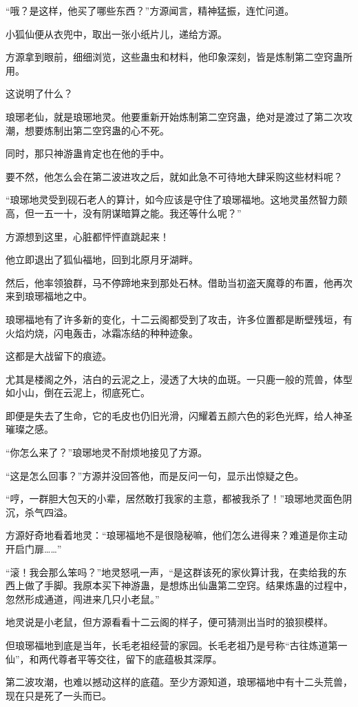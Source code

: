 \begin{this_body}
“哦？是这样，他买了哪些东西？”方源闻言，精神猛振，连忙问道。

小狐仙便从衣兜中，取出一张小纸片儿，递给方源。

方源拿到眼前，细细浏览，这些蛊虫和材料，他印象深刻，皆是炼制第二空窍蛊所用。

这说明了什么？

琅琊老仙，就是琅琊地灵。他要重新开始炼制第二空窍蛊，绝对是渡过了第二次攻潮，想要炼制出第二空窍蛊的心不死。

同时，那只神游蛊肯定也在他的手中。

要不然，他怎么会在第二波进攻之后，就如此急不可待地大肆采购这些材料呢？

“琅琊地灵受到砚石老人的算计，如今应该是守住了琅琊福地。这地灵虽然智力颇高，但一五一十，没有阴谋暗算之能。我还等什么呢？”

方源想到这里，心脏都怦怦直跳起来！

他立即退出了狐仙福地，回到北原月牙湖畔。

然后，他率领狼群，马不停蹄地来到那处石林。借助当初盗天魔尊的布置，他再次来到琅琊福地之中。

琅琊福地有了许多新的变化，十二云阁都受到了攻击，许多位置都是断壁残垣，有火焰灼烧，闪电轰击，冰霜冻结的种种迹象。

这都是大战留下的痕迹。

尤其是楼阁之外，洁白的云泥之上，浸透了大块的血斑。一只鹿一般的荒兽，体型如小山，倒在云泥上，彻底死亡。

即便是失去了生命，它的毛皮也仍旧光滑，闪耀着五颜六色的彩色光辉，给人神圣璀璨之感。

“你怎么来了？”琅琊地灵不耐烦地接见了方源。

“这是怎么回事？”方源并没回答他，而是反问一句，显示出惊疑之色。

“哼，一群胆大包天的小辈，居然敢打我家的主意，都被我杀了！”琅琊地灵面色阴沉，杀气四溢。

方源好奇地看着地灵：“琅琊福地不是很隐秘嘛，他们怎么进得来？难道是你主动开启门扉……”

“滚！我会那么笨吗？”地灵怒吼一声，“是这群该死的家伙算计我，在卖给我的东西上做了手脚。我原本买下神游蛊，是想炼出仙蛊第二空窍。结果炼蛊的过程中，忽然形成通道，闯进来几只小老鼠。”

地灵说是小老鼠，但方源看看十二云阁的样子，便可猜测出当时的狼狈模样。

但琅琊福地到底是当年，长毛老祖经营的家园。长毛老祖乃是号称“古往炼道第一仙”，和两代尊者平等交往，留下的底蕴极其深厚。

第二波攻潮，也难以撼动这样的底蕴。至少方源知道，琅琊福地中有十二头荒兽，现在只是死了一头而已。


\end{this_body}
